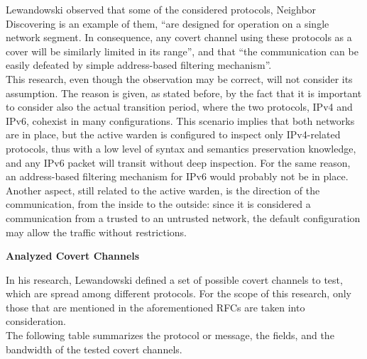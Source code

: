 \documentclass[12pt]{article}
\begin{document}
Lewandowski observed that some of the considered protocols, Neighbor Discovering is an example of them, ``are designed for operation on a single network segment. In consequence, any covert channel using these protocols 
as a cover will be similarly limited in its range'', and that ``the communication can be easily defeated by simple address-based filtering mechanism''.\\
This research, even though the observation may be correct,  will not consider its assumption. The reason is given, as stated before, by the fact that it is important to consider also the actual transition period, where 
the two protocols, IPv4 and IPv6, cohexist in many configurations. This scenario implies that both networks are in place, but the active warden is configured to inspect only IPv4-related protocols, thus with a low level of 
syntax and semantics preservation knowledge, and any IPv6 packet will transit without deep inspection. For the same reason, an address-based filtering mechanism for IPv6 would probably not be in place. Another aspect, 
still related to the active warden, is the direction of the communication, from the inside to the outside: since it is considered a communication from a trusted to an untrusted network, the default configuration may 
allow the traffic without restrictions.


\textbf{Analyzed Covert Channels}

In his research, Lewandowski defined a set of possible covert channels to test, which are spread among different protocols. For the scope of this research, only those that are mentioned in the aforementioned RFCs are 
taken into consideration.\\

The following table summarizes the protocol or message, the fields, and the bandwidth of the tested covert channels.
\end{document}
